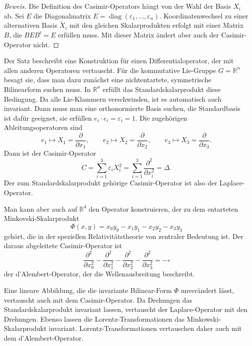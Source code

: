 \begin{proof}[Beweis]
Die Definition des Casimir-Operators hängt von der Wahl der Basis
$X_i$ ab.
Sei $E$ die Diagonalmatrix
$E=\operatorname{diag}(\varepsilon_1,\dots,\varepsilon_n)$.
Koordinatenwechsel zu einer alternativen Basis $\tilde{X}_i$ mit den gleichen
Skalarprodukten erfolgt mit einer Matrix $B$, die $BEB^{t}=E$ erfüllen muss.
Mit dieser Matrix ändert aber auch der Casimir-Operator nicht.
\end{proof}

Der Satz beschreibt eine Konstruktion für einen Differentialoperator,
der mit allen anderen Operatoren vertauscht.
Für die kommutative Lie-Gruppe $G=\mathbb{R}^n$ besagt sie, dass man
dazu zunächst eine nichtentartete, symmetrische Bilinearform suchen muss.
In $\mathbb{R}^n$ erfüllt das Standardskalarprodukt diese Bedingung.
Da alle Lie-Klammern verschwinden, ist es automatisch auch invariant.
Dann muss man eine orthonormierte Basis suchen, die Standardbasis
ist dafür geeignet, sie erfüllen $e_i\cdot e_i=\varepsilon_i=1$.
Die zugehörigen Ableitungsoperatoren sind
\[
e_1 \mapsto X_1 = \frac{\partial}{\partial x_1},
\qquad
e_2 \mapsto X_2 = \frac{\partial}{\partial x_2},
\qquad
e_3 \mapsto X_3 = \frac{\partial}{\partial x_3}.
\]
Dann ist der Casimir-Operator
\[
C=
\sum_{i=1}^3 \varepsilon_i X_i^2
=
\sum_{i=1}^3 \frac{\partial^2}{\partial x_i^2}
=
\Delta.
\]
Der zum Standardskalarprodukt gehörige Casimir-Operator ist also
der Laplace-Operator.

Man kann aber auch auf $\mathbb{R}^4$ den Operator konstruieren, der
zu dem entarteten Minkovski-Skalarprodukt
\[
\Phi(x,y)
=
x_0y_0
-
x_1y_1
-
x_2y_2
-
x_3y_3
\]
gehört, die in der speziellen Relativitätstheorie von zentraler Bedeutung
ist.
Der daraus abgeleitete Casimir-Operator ist
\[
\frac{\partial^2}{\partial x_0^2}
-
\frac{\partial^2}{\partial x_1^2}
-
\frac{\partial^2}{\partial x_2^2}
-
\frac{\partial^2}{\partial x_3^2}
=
-\square
\]
der d'Alembert-Operator, der die Wellenausbreitung beschreibt.

Eine lineare Abbildung, die die invariante Bilinear-Form $\Phi$ unverändert
lässt, vertauscht auch mit dem Casimir-Operator.
Da Drehungen das Standardskalarprodukt invariant lassen, vertauscht
der Laplace-Operator mit den Drehungen.
Ebenso lassen die Lorentz-Transformationen das Minkowski-Skalarprodukt
invariant.
Lorentz-Transformationen vertauschen daher auch mit dem d'Alembert-Operator.

